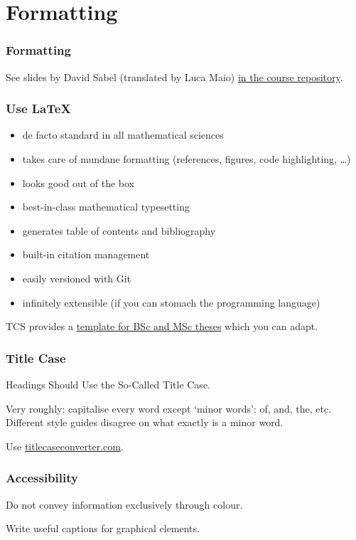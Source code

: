 \section{Formatting}

\begin{frame}
  \frametitle{Formatting}

  See slides by David Sabel (translated by Luca Maio) \href{https://github.com/JLimperg/dtt-seminar-2024/}{in the course repository}.
\end{frame}

\begin{frame}
  \frametitle{Use \LaTeX}

  \begin{itemize}[<+->]
    \item de facto standard in all mathematical sciences
    \item takes care of mundane formatting (references, figures, code highlighting, \dots)
    \item looks good out of the box
    \item best-in-class mathematical typesetting
    \item generates table of contents and bibliography
    \item built-in citation management
    \item easily versioned with Git
    \item infinitely extensible (if you can stomach the programming language)
  \end{itemize}

  \medskip
  \pause

  TCS provides a \href{https://www.tcs.ifi.lmu.de/lehre/bsc-master-arbeiten_de.html}{template for BSc and MSc theses} which you can adapt.
\end{frame}

\begin{frame}
  \frametitle{Title Case}

  Headings Should Use the So-Called Title Case.

  \medskip

  Very roughly: capitalise every word except \enquote*{minor words}: of, and, the, etc.
  Different style guides disagree on what exactly is a minor word.

  \medskip
  \pause

  Use \url{titlecaseconverter.com}.
\end{frame}

\begin{frame}
  \frametitle{Accessibility}

  Do not convey information exclusively through colour.

  \medskip
  \pause

  Write useful captions for graphical elements.
\end{frame}

